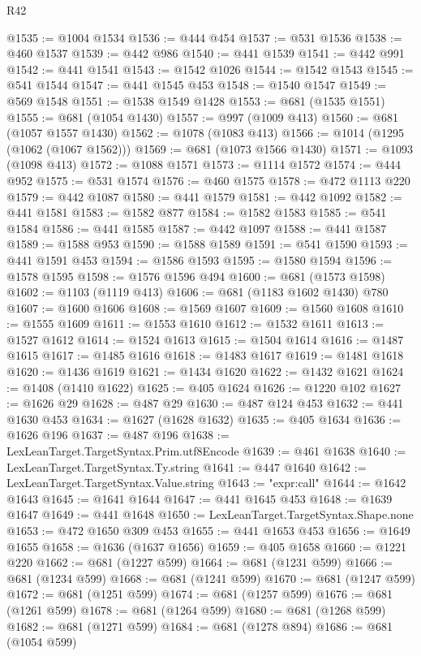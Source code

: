 \begin{lexlean}{R42}
\begin{coremodule}
@1535 := @1004 @1534
@1536 := @444 @454
@1537 := @531 @1536
@1538 := @460 @1537
@1539 := @442 @986
@1540 := @441 @1539
@1541 := @442 @991
@1542 := @441 @1541
@1543 := @1542 @1026
@1544 := @1542 @1543
@1545 := @541 @1544
@1547 := @441 @1545 @453
@1548 := @1540 @1547
@1549 := @569 @1548
@1551 := @1538 @1549 @1428
@1553 := @681 (@1535 @1551)
@1555 := @681 (@1054 @1430)
@1557 := @997 (@1009 @413)
@1560 := @681 (@1057 @1557 @1430)
@1562 := @1078 (@1083 @413)
@1566 := @1014 (@1295 (@1062 (@1067 @1562)))
@1569 := @681 (@1073 @1566 @1430)
@1571 := @1093 (@1098 @413)
@1572 := @1088 @1571
@1573 := @1114 @1572
@1574 := @444 @952
@1575 := @531 @1574
@1576 := @460 @1575
@1578 := @472 @1113 @220
@1579 := @442 @1087
@1580 := @441 @1579
@1581 := @442 @1092
@1582 := @441 @1581
@1583 := @1582 @877
@1584 := @1582 @1583
@1585 := @541 @1584
@1586 := @441 @1585
@1587 := @442 @1097
@1588 := @441 @1587
@1589 := @1588 @953
@1590 := @1588 @1589
@1591 := @541 @1590
@1593 := @441 @1591 @453
@1594 := @1586 @1593
@1595 := @1580 @1594
@1596 := @1578 @1595
@1598 := @1576 @1596 @494
@1600 := @681 (@1573 @1598)
@1602 := @1103 (@1119 @413)
@1606 := @681 (@1183 @1602 @1430) @780
@1607 := @1600 @1606
@1608 := @1569 @1607
@1609 := @1560 @1608
@1610 := @1555 @1609
@1611 := @1553 @1610
@1612 := @1532 @1611
@1613 := @1527 @1612
@1614 := @1524 @1613
@1615 := @1504 @1614
@1616 := @1487 @1615
@1617 := @1485 @1616
@1618 := @1483 @1617
@1619 := @1481 @1618
@1620 := @1436 @1619
@1621 := @1434 @1620
@1622 := @1432 @1621
@1624 := @1408 (@1410 @1622)
@1625 := @405 @1624
@1626 := @1220 @102
@1627 := @1626 @29
@1628 := @487 @29
@1630 := @487 @124 @453
@1632 := @441 @1630 @453
@1634 := @1627 (@1628 @1632)
@1635 := @405 @1634
@1636 := @1626 @196
@1637 := @487 @196
@1638 := LexLeanTarget.TargetSyntax.Prim.utf8Encode
@1639 := @461 @1638
@1640 := LexLeanTarget.TargetSyntax.Ty.string
@1641 := @447 @1640
@1642 := LexLeanTarget.TargetSyntax.Value.string
@1643 := "expr:call"
@1644 := @1642 @1643
@1645 := @1641 @1644
@1647 := @441 @1645 @453
@1648 := @1639 @1647
@1649 := @441 @1648
@1650 := LexLeanTarget.TargetSyntax.Shape.none
@1653 := @472 @1650 @309 @453
@1655 := @441 @1653 @453
@1656 := @1649 @1655
@1658 := @1636 (@1637 @1656)
@1659 := @405 @1658
@1660 := @1221 @220
@1662 := @681 (@1227 @599)
@1664 := @681 (@1231 @599)
@1666 := @681 (@1234 @599)
@1668 := @681 (@1241 @599)
@1670 := @681 (@1247 @599)
@1672 := @681 (@1251 @599)
@1674 := @681 (@1257 @599)
@1676 := @681 (@1261 @599)
@1678 := @681 (@1264 @599)
@1680 := @681 (@1268 @599)
@1682 := @681 (@1271 @599)
@1684 := @681 (@1278 @894)
@1686 := @681 (@1054 @599)

\end{coremodule}
\end{lexlean}
